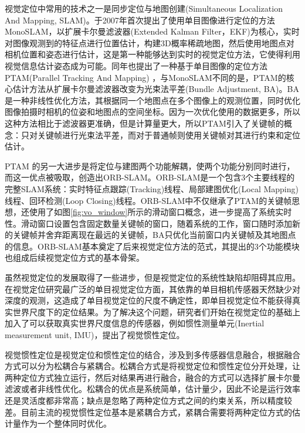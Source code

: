 视觉定位中常用的技术之一是同步定位与地图创建(Simultaneous Localization And Mapping, SLAM)。\citet{davison2007monoslam}于2007年首次提出了使用单目图像进行定位的方法MonoSLAM，以扩展卡尔曼滤波器(Extended Kalman Filter，EKF)为核心，实时对图像观测到的特征点进行位置估计，构建3D概率稀疏地图，然后使用地图点对相机位置和姿态进行估计，这是第一种能够达到实时的视觉定位方法，它使得利用视觉信息估计姿态成为可能。同年\citet{klein2007parallel}也提出了一种基于单目图像的定位方法PTAM(Parallel Tracking And Mapping) ，与MonoSLAM不同的是，PTAM的核心估计方法从扩展卡尔曼滤波器改变为光束法平差(Bundle Adjustment, BA)\cite{triggs2000bundle}。BA是一种非线性优化方法，其根据同一个地图点在多个图像上的观测位置，同时优化图像拍摄时相机的位姿和地图点的空间坐标。因为一次优化使用的数据更多，所以这种方法相比于滤波器更准确，但是计算量更大，所以PTAM引入了关键帧的概念：只对关键帧进行光束法平差，而对于普通帧则使用关键帧对其进行约束和定位估计。

PTAM 的另一大进步是将定位与建图两个功能解耦，使两个功能分别同时进行，而这一优点被\citet{mur2015orb,mur2017orb}吸取，创造出ORB-SLAM。ORB-SLAM是一个包含3个主要线程的完整SLAM系统：实时特征点跟踪(Tracking)线程、局部建图优化(Local Mapping)线程、回环检测(Loop Closing)线程。ORB-SLAM中不仅继承了PTAM的关键帧思想，还使用了如图\ref{fig:vo_window}所示的滑动窗口概念，进一步提高了系统实时性。滑动窗口设置包含固定数量关键帧的窗口，随着系统的工作，窗口随时添加新的关键帧并舍弃距离现在最远的关键帧，BA只优化当前窗口内关键帧及其地图点的信息。ORB-SLAM基本奠定了后来视觉定位方法的范式，其提出的3个功能模块也组成后续视觉定位方式的基本骨架。

虽然视觉定位的发展取得了一些进步，但是视觉定位的系统性缺陷却阻碍其应用。在视觉定位研究最广泛的单目视觉定位方面，其依靠的单目相机传感器天然缺少对深度的观测，这造成了单目视觉定位的尺度不确定性，即单目视觉定位不能获得真实世界尺度下的定位结果。为了解决这个问题，研究者们开始在视觉定位的基础上加入了可以获取真实世界尺度信息的传感器，例如惯性测量单元(Inertial measurement unit, IMU)，提出了视觉惯性定位。

视觉惯性定位是视觉定位和惯性定位的结合，涉及到多传感器信息融合，根据融合方式可以分为松耦合\cite{lynen2013robust}与紧耦合\cite{falquez2016inertial}。松耦合方式是将视觉定位和惯性定位分开处理，让两种定位方式独立运行，然后对结果再进行融合，融合的方式可以选择扩展卡尔曼滤波或者非线性优化。松耦合的优点是系统简单，估计量少，因此不论是运行效率还是灵活度都非常高；缺点是忽略了两种定位方式之间的约束关系，所以精度较差。目前主流的视觉惯性定位基本是紧耦合方式，紧耦合需要将两种定位方式的估计量作为一个整体同时优化。

